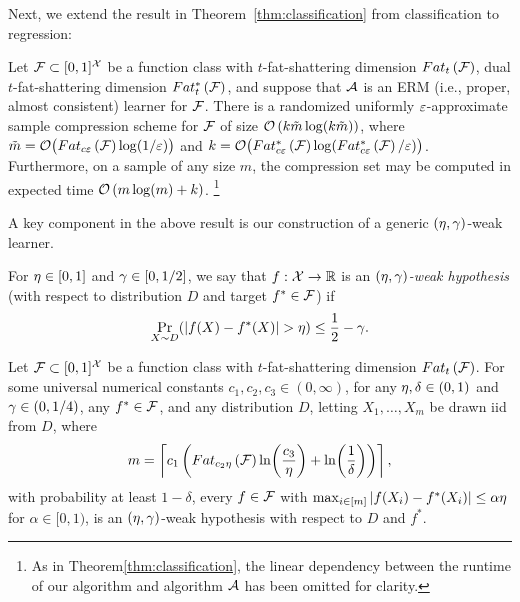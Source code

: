 \documentclass[12pt,a4paper,oneside,onecolumn]{book}
\begin{document}
Next, we extend the result in
Theorem~\ref{thm:classification}
from classification to regression:
\begin{theorem}
\label{thm:regression}
Let $\mathcal{F}\subset[0,1]^{\mathcal{X}}$
be a function class
with
$t$-fat-shattering dimension $Fat_{t}\left(\mathcal{F}\right)$,
dual $t$-fat-shattering dimension $Fat^*_{t}\left(\mathcal{F}\right)$,
and suppose that $\mathcal{A}$ is an ERM (i.e., proper, almost consistent) learner for $\mathcal{F}$.
There is
a randomized
uniformly $\varepsilon$-approximate sample compression scheme for $\mathcal{F}$ of size 
$\mathcal{O}\left(k\tilde{m} \log(k \tilde{m}) \right)$, 
where
$\tilde m = \mathcal{O}\big( Fat_{c\varepsilon}\left(\mathcal{F}\right) \log(1/\varepsilon) \big)$
and
\small{$k = \mathcal{O}\big(Fat^*_{c\varepsilon}\left(\mathcal{F}\right)\log(Fat^*_{c\varepsilon}\left(\mathcal{F}\right)/\varepsilon)\big)$}.
Furthermore,
on a sample of any size $m$,
the compression set may be computed in
expected
time $\mathcal{O}\left(m \log(m) + k\right)$.
\footnote{As in Theorem\ref{thm:classification}, the linear dependency between the runtime of our algorithm and algorithm $\mathcal{A}$ has been omitted for clarity.}
\end{theorem}  

A key component in the above result is our construction
of a generic $(\eta,\gamma)$-weak learner.
\begin{definition}
  \label{def:weak}
  For $\eta \in [0,1]$ and $\gamma \in [0,1/2]$,
  we say that $f:\mathcal{X}\to\mathbb{R}$ is  
  an \emph{$(\eta,\gamma)$-weak hypothesis}
  (with respect to distribution $D$ and target $f^*\in\mathcal{F}$)
if $$\Pr_{X\sim D}(|f(X)-f^*(X)|>\dev)\le \frac12-\adv.$$
\end{definition}

\begin{theorem}
  \label{thm:gen-weak-learn}
  Let $\mathcal{F}\subset[0,1]^{\mathcal{X}}$ be a
  function class
  with $t$-fat-shattering dimension $Fat_{t}\left(\mathcal{F}\right)$.
For some universal numerical constants $c_{1},c_{2},c_{3} \in (0,\infty)$, 
for any $\eta,\delta \in (0,1)$ and $\gamma \in (0,1/4)$,
any $f^*\in\mathcal{F}$,
and any distribution $D$,
letting $X_{1},\ldots,X_{m}$ be drawn iid from $D$, where 
\begin{equation*}
  m = \left\lceil c_{1} \left(  Fat_{c_{2} \eta }\left(\mathcal{F}\right) \ln\!\left( \frac{c_{3}}{\eta} \right) + \ln\!\left(\frac{1}{\delta}\right) \right) \right\rceil,
\end{equation*}
with probability at least $1-\delta$, every $f \in \mathcal{F}$ with
$
\max_{i\in[m]}
|f(X_{i}) - f^{*}(X_{i})| \leq \alpha \eta$
for $\alpha \in [0,1)$,
is an $(\eta,\gamma)$-weak hypothesis
with respect to $D$ and $f^*$.
\end{theorem}
\end{document}
